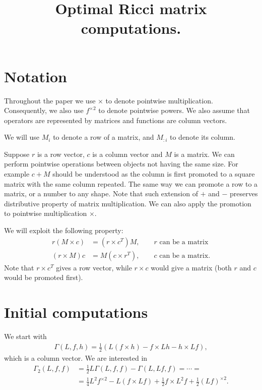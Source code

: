 \documentclass[12pt]{amsart}
\title{Optimal Ricci matrix computations.}
\begin{document}
\maketitle

\section{Notation}
\label{sec:Notation}

Throughout the paper we use $\times$ to denote pointwise multiplication. Consequently, we also use $f^{\times2}$ to denote pointwise powers. We also assume that operators are represented by matrices and functions are column vectors. 

We will use $M_i$ to denote a row of a matrix, and $M_{:i}$ to denote its column.

Suppose $r$ is a row vector, $c$ is a column vector and $M$ is a matrix. We can perform pointwise operations between objects not having the same size. For example $c+M$ should be understood as the column is first promoted to a square matrix with the same column repeated. The same way we can promote a row to a matrix, or a number to any shape. Note that such extension of $+$ and $-$ preserves distributive property of matrix multiplication. We can also apply the promotion to pointwise multiplication $\times$.

We will exploit the following property:
\begin{align}\label{property}
    r(M\times c)&=(r\times c^T)M, \qquad r\text{ can be a matrix}\\
    (r\times M)c &= M(c\times r^T), \qquad c\text{ can be a matrix}.
\end{align}
Note that $r\times c^T$ gives a row vector, while $r\times c$ would give a matrix (both $r$ and $c$ would be promoted first).

\section{Initial computations}
We start with
\begin{align*}
    \Gamma(L, f, h) = \frac{1}{2} \left(L(f\times h) - f\times Lh-h\times Lf\right),
\end{align*}
which is a column vector.
We are interested in
\begin{align}
    \Gamma_2(L, f, f) &= \frac{1}{2}L\Gamma(L, f, f) - \Gamma(L, Lf, f)=\cdots=\nonumber
    \\&=\frac{1}{4} L^2f^{\times2}-L(f\times Lf)+\frac{1}{2}f\times L^2f+\frac{1}{2}(Lf)^{\times2}.\label{Gamma2}
\end{align}
\end{document}
